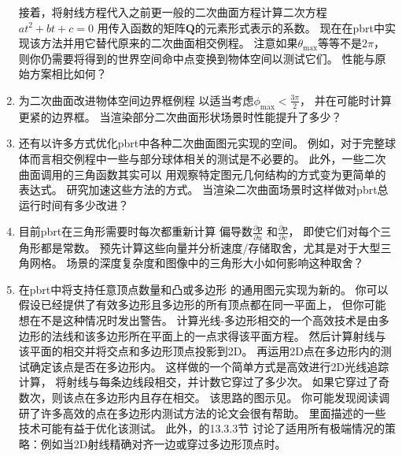 \begin{enumerate}
          接着，将射线方程代入之前更一般的二次曲面方程计算二次方程$at^2+bt+c=0$
          用传入函数的矩阵$\bm Q$的元素形式表示的系数。
          现在在pbrt中实现该方法并用它替代原来的二次曲面相交例程。
          注意如果$\theta_{\max}$等等不是$2\pi$，
          则你仍需要将得到的世界空间命中点变换到物体空间以测试它们。
          性能与原始方案相比如何？
    \item \circleone 为二次曲面改进物体空间边界框例程
          以适当考虑$\displaystyle\phi_{\max}<\frac{3\pi}{2}$，
          并在可能时计算更紧的边界框。
          当渲染部分二次曲面形状场景时性能提升了多少？
    \item \circletwo 还有以许多方式优化pbrt中各种二次曲面图元实现的空间。
          例如，对于完整球体而言相交例程中一些与部分球体相关的测试是不必要的。
          此外，一些二次曲面调用的三角函数其实可以
          用观察特定图元几何结构的方式变为更简单的表达式。
          研究加速这些方法的方式。
          当渲染二次曲面场景时这样做对pbrt总运行时间有多少改进？
    \item \circleone 目前pbrt在三角形需要时每次都重新计算
          偏导数$\displaystyle\frac{\partial \bm p}{\partial u}$
          和$\displaystyle\frac{\partial \bm p}{\partial v}$，
          即使它们对每个三角形都是常数。
          预先计算这些向量并分析速度/存储取舍，尤其是对于大型三角网格。
          场景的深度复杂度和图像中的三角形大小如何影响这种取舍？
    \item \circletwo 在pbrt中将支持任意顶点数量和凸或多边形
          的通用图元实现为新的。
          你可以假设已经提供了有效多边形且多边形的所有顶点都在同一平面上，
          但你可能想在不是这种情况时发出警告。
          计算光线-多边形相交的一个高效技术是由多边形的法线和该多边形所在平面上的一点求得该平面方程。
          然后计算射线与该平面的相交并将交点和多边形顶点投影到2D。
          再运用2D点在多边形内的测试确定该点是否在多边形内。
          这样做的一个简单方式是高效进行2D光线追踪计算，
          将射线与每条边线段相交，并计数它穿过了多少次。
          如果它穿过了奇数次，则该点在多边形内且存在相交。
          该思路的图示见。
          你可能发现阅读\citet{HAINES199424}调研了许多高效的点在多边形内测试方法的论文会很有帮助。
          里面描述的一些技术可能有益于优化该测试。
          此外，\citet{10.5555/2821579}的13.3.3节
          讨论了适用所有极端情况的策略：例如当2D射线精确对齐一边或穿过多边形顶点时。
          \begin{figure}[htbp]
              \centering

\end{figure}
\end{enumerate}

